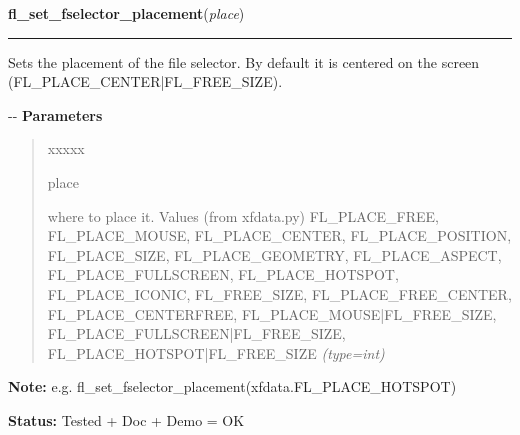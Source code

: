 \hspace{.8\funcindent}\begin{boxedminipage}{\funcwidth}

    \raggedright \textbf{fl\_set\_fselector\_placement}(\textit{place})

    \vspace{-1.5ex}

    \rule{\textwidth}{0.5\fboxrule}
\setlength{\parskip}{2ex}

Sets the placement of the file selector. By default it is centered
on the screen (FL\_PLACE\_CENTER|FL\_FREE\_SIZE).

-{}-
\setlength{\parskip}{1ex}
      \textbf{Parameters}
      \vspace{-1ex}

      \begin{quote}
        \begin{Ventry}{xxxxx}

          \item[place]


where to place it. Values (from xfdata.py) FL\_PLACE\_FREE,
FL\_PLACE\_MOUSE, FL\_PLACE\_CENTER, FL\_PLACE\_POSITION, FL\_PLACE\_SIZE,
FL\_PLACE\_GEOMETRY, FL\_PLACE\_ASPECT, FL\_PLACE\_FULLSCREEN,
FL\_PLACE\_HOTSPOT, FL\_PLACE\_ICONIC, FL\_FREE\_SIZE, FL\_PLACE\_FREE\_CENTER,
FL\_PLACE\_CENTERFREE, FL\_PLACE\_MOUSE|FL\_FREE\_SIZE,
FL\_PLACE\_FULLSCREEN|FL\_FREE\_SIZE, FL\_PLACE\_HOTSPOT|FL\_FREE\_SIZE
            {\it (type=int)}

        \end{Ventry}

      \end{quote}

\textbf{Note:} 
e.g. fl\_set\_fselector\_placement(xfdata.FL\_PLACE\_HOTSPOT)


\textbf{Status:} 
Tested + Doc + Demo = OK


    \end{boxedminipage}

    \label{xformslib:flgoodies:fl_set_fselector_border}

    \vspace{0.5ex}

